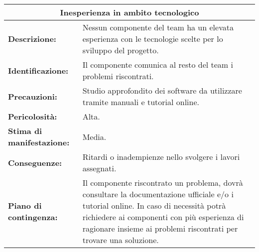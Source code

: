 \begin{tabular}{ |p{4cm}|p{10cm}|}
\hline
\multicolumn{2}{|c|}{\textbf{Inesperienza in ambito tecnologico}} \\
\hline
\textbf{Descrizione:}& Nessun componente del team ha un elevata esperienza con le tecnologie scelte per lo sviluppo del progetto.\\
\hline
\textbf{Identificazione:}& Il componente comunica al resto del team i problemi riscontrati.\\
\hline
\textbf{Precauzioni:}& Studio approfondito dei software da utilizzare tramite manuali e tutorial online.\\
\hline
\textbf{Pericolosità:}& Alta.\\
\hline
\textbf{Stima di manifestazione:}& Media.\\
\hline
\textbf{Conseguenze:}& Ritardi o inadempienze nello svolgere i lavori assegnati.\\
\hline
\textbf{Piano di contingenza:}& Il componente riscontrato un problema, dovrà consultare la documentazione ufficiale e/o i tutorial online. In caso di necessità potrà richiedere ai componenti con più esperienza di ragionare insieme ai problemi riscontrati per trovare una soluzione.\\
\hline
\end{tabular}

\vspace{20pt}

